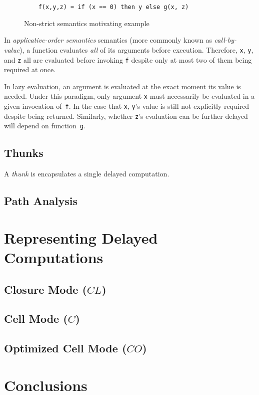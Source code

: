 \documentclass[11pt]{article}
\begin{document}
\begin{figure}[h]
  \centering
  \begin{lstlisting}
    f(x,y,z) = if (x == 0) then y else g(x, z)
  \end{lstlisting}
  \caption{Non-strict semantics motivating example}
  \label{fig:LazyEvalExample}
\end{figure}

In \textit{applicative-order semantics} semantics (more commonly known as \textit{call-by-value}), a function evaluates \textit{all} of its arguments before execution.  Therefore, \texttt{x}, \texttt{y}, and \texttt{z} all are evaluated before invoking \texttt{f} despite only at most two of them being required at once.

In lazy evaluation, an argument is evaluated at the exact moment its value is needed.  Under this paradigm, only argument \texttt{x} must necessarily be evaluated in a given invocation of~\texttt{f}. In the case that \texttt{x}, \texttt{y}'s value is still not explicitly required despite being returned.  Similarly, whether \texttt{z}'s evaluation can be further delayed will depend on function~\texttt{g}.

\subsection{Thunks}\label{sec:Thunks}

A \textit{thunk} is encapsulates a single delayed computation.

\subsection{Path Analysis}\label{sec:PathAnalysis}

\section{Representing Delayed Computations}\label{sec:RepresentingDelayedComputation}

\subsection{Closure Mode ($CL$)}\label{sec:ClosureMode}

\subsection{Cell Mode ($C$)}\label{sec:CellMode}

\subsection{Optimized Cell Mode ($CO$)}\label{sec:OptCellMode}

\section{Conclusions}\label{sec:Conclusions}



\end{document}
